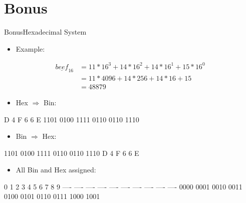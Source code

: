 
\section{Bonus}

\begin{frame}{Bonus}{Hexadecimal System}
  \begin{itemize}
    \item \alert{Example:}
  \end{itemize}
  \begin{dmath}
    \begin{aligned}
      \underline{beef}_{16} &= 11 * 16^3 + 14 * 16^2 + 14 * 16^1 + 15 * 16^0 \\
      &= 11 * 4096 + 14 * 256 + 14 * 16 + 15 \\
      &= 48879
    \end{aligned}
  \end{dmath}

  \centering
  \begin{itemize}
    \item \alert{Hex $\Rightarrow$ Bin:}
  \end{itemize}
  \begin{terminal}
     D    4    F    6    6    E
  1101 0100 1111 0110 0110 1110
  \end{terminal}
  \begin{itemize}
    \item \alert{Bin $\Rightarrow$ Hex:}
  \end{itemize}
  \begin{terminal}
  1101 0100 1111 0110 0110 1110
     D    4    F    6    6    E
  \end{terminal}

  \begin{itemize}
    \item \alert{All Bin and Hex assigned:}
  \end{itemize}
  \begin{terminal}
  0    1    2    3    4    5    6    7    8    9
  ---- ---- ---- ---- ---- ---- ---- ---- ---- ----
  0000 0001 0010 0011 0100 0101 0110 0111 1000 1001


\end{terminal}
\end{frame}
